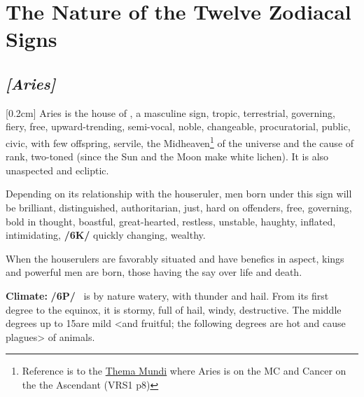 
\section{The Nature of the Twelve Zodiacal Signs}
\subsection{\textit{[Aries]}}
[0.2cm]
 Aries is the house of \Mars, a  masculine sign,  tropic,  terrestrial, governing,  fiery, free, upward-trending,  semi-vocal, noble, changeable, procuratorial, public, civic, with few offspring,  servile, the Midheaven\footnote{Reference is to the \href{http://planetwavesweekly.com/dadatemp/1832374392.html}{Thema Mundi} where Aries is on the MC and Cancer on the the Ascendant (VRS1 p8)} of the universe and the cause of rank, two-toned (since the Sun and the Moon make white lichen). It is also unaspected and ecliptic. 

\mndl[0.2cm]
Depending on its relationship with the houseruler, men born under this sign will be brilliant, distinguished, authoritarian, just, hard on offenders, free, governing, bold in thought, boastful, great-hearted, restless, unstable, haughty, inflated, intimidating, \textbf{/6K/} quickly changing, wealthy. 

\mndl[0.2cm]
When the houserulers are favorably situated and have benefics in aspect, kings and powerful men are born, those having the say over life and death.

\textbf{Climate:} \textbf{/6P/} \Aries\, is by nature watery, with thunder and hail. From its first degree to the equinox, it is stormy, full of hail, windy, destructive. The middle degrees up to 15\deg are mild <and fruitful; the following degrees are hot and cause plagues> of animals. 

